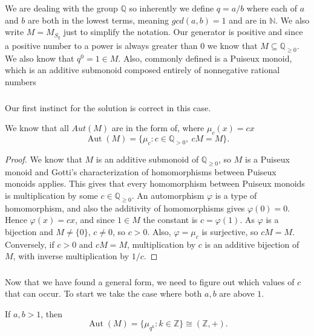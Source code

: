 \documentclass[11pt]{scrartcl}
\begin{document}
\begin{soln}
	We are dealing with the group $\mathbb{Q}$ so inherently we define 
	$q = a/b$ where each of $a$ and $b$ are both in the lowest terms, meaning $gcd(a,b)=1$ and 
	are in $\mathbb{N}$. We also write $M = M_{S_q}$ just to simplify the 
	notation. Our generator is positive and since a positive number to a power
	is always greater than $0$ we know that $M \subseteq \mathbb Q_{\ge 0}$. We 
	also know that $q^0=1\in M$. Also, commonly defined is a 
	Puiseux monoid, which 
	is an additive submonoid composed entirely of nonnegative rational numbers

    \subsubsection*{}
	Our first instinct for the solution is correct in this case. 
    \begin{claim*}
		We know that all $Aut(M)$ are in the form of, where 
		$\mu_c(x)=cx$ 
        \[
        \operatorname{Aut}(M)
        =\{\mu_c:c\in\mathbb Q_{>0},\ cM=M\}.
        \]
    \end{claim*}
    \begin{proof}
         We know that $M$ is an additive submonoid of $\mathbb Q_{\ge0}$,
		so $M$ is a Puiseux monoid and Gotti's characterization of homomorphisms between Puiseux
        monoids \cite[Proposition~3.2(1)]{p6-gotti} applies. This gives that every homomorphism
        between Puiseux monoids is multiplication by some $c\in\mathbb Q_{\ge0}$.
        An automorphism $\varphi$ is a type of homomorphism, and also the additivity 
        of homomorphisms gives $\varphi(0)=0$. Hence $\varphi(x)=cx$, and since
        $1\in M$ the constant is $c=\varphi(1)$. As $\varphi$ is a bijection and $M\neq\{0\}$,
        $c\neq0$, so $c>0$. Also, $\varphi=\mu_c$ is surjective, so $cM=M$.
        Conversely, if $c>0$ and $cM=M$, multiplication by $c$ is an
        additive bijection of $M$, with inverse multiplication by $1/c$.
    \end{proof}

    \subsubsection*{}

	Now that we have found a general form, we need to figure out which values 
	of $c$ that can occur. To start we take the case where both $a,b$ are above $1$.
    \begin{claim*}
        If $a,b>1$, then
        \[
        \operatorname{Aut}(M)
        =\{\mu_{q^k}:k\in\mathbb Z\}
        \cong(\mathbb Z,+).
        \]
    \end{claim*}


\end{soln}
\end{document}
